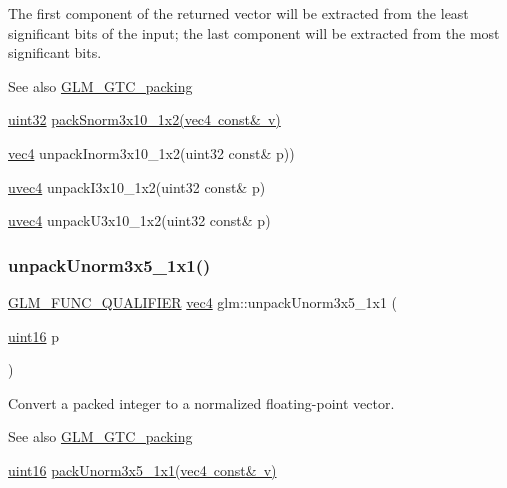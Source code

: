 The first component of the returned vector will be extracted from the least significant bits of the input; the last component will be extracted from the most significant bits.

\begin{DoxySeeAlso}{See also}
\mbox{\hyperlink{group__gtc__packing}{G\+L\+M\+\_\+\+G\+T\+C\+\_\+packing}} 

\mbox{\hyperlink{group__gtc__type__precision_ga202b6a53c105fcb7e531f9b443518451}{uint32}} \mbox{\hyperlink{group__gtc__packing_ga0d4157cec37c0312216a7be1cc92df54}{pack\+Snorm3x10\+\_\+1x2(vec4 const\& v)}} 

\mbox{\hyperlink{group__core__types_ga5881b1b022d7fd1b7218f5916532dd02}{vec4}} unpack\+Inorm3x10\+\_\+1x2(uint32 const\& p)) 

\mbox{\hyperlink{group__core__types_ga1c426d19627b32b14f0089f7f4ba7b1d}{uvec4}} unpack\+I3x10\+\_\+1x2(uint32 const\& p) 

\mbox{\hyperlink{group__core__types_ga1c426d19627b32b14f0089f7f4ba7b1d}{uvec4}} unpack\+U3x10\+\_\+1x2(uint32 const\& p) 
\end{DoxySeeAlso}
\mbox{\label{group__gtc__packing_gaab3b476e8f320670717fd518f350ce28}} 
\subsubsection{\texorpdfstring{unpack\+Unorm3x5\+\_\+1x1()}{unpackUnorm3x5\_1x1()}}
{\footnotesize\ttfamily \mbox{\hyperlink{setup_8hpp_a33fdea6f91c5f834105f7415e2a64407}{G\+L\+M\+\_\+\+F\+U\+N\+C\+\_\+\+Q\+U\+A\+L\+I\+F\+I\+ER}} \mbox{\hyperlink{group__core__types_ga5881b1b022d7fd1b7218f5916532dd02}{vec4}} glm\+::unpack\+Unorm3x5\+\_\+1x1 (\begin{DoxyParamCaption}\item[{\mbox{\hyperlink{group__gtc__type__precision_gad8c2939e1fdd8e5828b31d95c52255d5}{uint16}}}]{p }\end{DoxyParamCaption})}

Convert a packed integer to a normalized floating-\/point vector.

\begin{DoxySeeAlso}{See also}
\mbox{\hyperlink{group__gtc__packing}{G\+L\+M\+\_\+\+G\+T\+C\+\_\+packing}} 

\mbox{\hyperlink{group__gtc__type__precision_gad8c2939e1fdd8e5828b31d95c52255d5}{uint16}} \mbox{\hyperlink{group__gtc__packing_ga1b41375846ed66768da78ca299d8d010}{pack\+Unorm3x5\+\_\+1x1(vec4 const\& v)}} 
\end{DoxySeeAlso}
\mbox{\label{group__gtc__packing_gafb2b502bc406031a5618ce930139a9e3}} 
